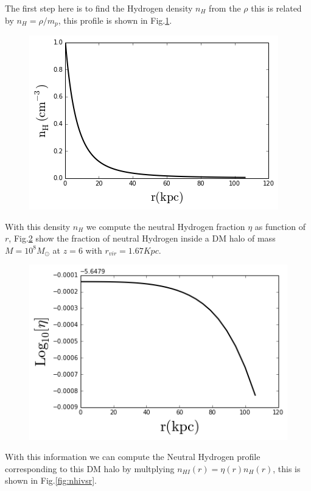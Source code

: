 \documentclass[12pt]{article}
\begin{document}
The first step here is to find the Hydrogen density $n_H$ from the $\rho$ this is related by $n_H = \rho / m_p$, 
this profile is shown in Fig.\ref{fig:nhvsr}.

\begin{figure}[H]\label{fig:nhvsr}
\centering
\includegraphics[scale=0.7]{../figures/nhvsr.png}
\end{figure} 

With this density $n_H$ we compute the neutral Hydrogen fraction $\eta$ as function of $r$, Fig.\ref{fig:etavsr}
show the fraction of neutral Hydrogen inside a DM halo of mass $M=10^8 M_{\odot}$ at $z=6$ with $r_{vir} = 1.67 Kpc$.

\begin{figure}[H]\label{fig:etavsr}
\centering
\includegraphics[scale=0.7]{../figures/etavsr.png}
\end{figure}

With this information we can compute the Neutral Hydrogen profile corresponding to this DM halo by multplying
$n_{HI}(r) = \eta(r) n_{H}(r)$, this is shown in Fig.\ref{fig:nhivsr}.
\end{document}
